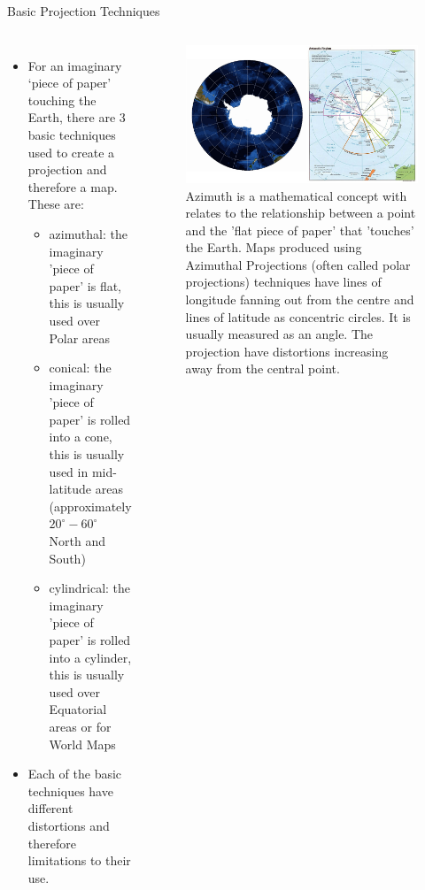 \documentclass[11pt,dvipsnames,ignorenonframetext,aspectratio=169]{beamer}
\providecommand{\tightlist}{%
  \setlength{\itemsep}{0pt}\setlength{\parskip}{0pt}}
\newcommand{\bcolumns}{\begin{columns}[T, onlytextwidth]}
\newcommand{\ecolumns}{\end{columns}}
\begin{document}
\begin{frame}{Basic Projection Techniques}
\protect\hypertarget{basic-projection-techniques}{}
\bcolumns
\small
{}

\begin{itemize}
\tightlist
\item
  For an imaginary `piece of paper' touching the Earth, there are 3
  basic techniques used to create a projection and therefore a map.
  These are:

  \begin{itemize}
  \footnotesize
  \item azimuthal: the imaginary 'piece of paper' is flat, this is usually used over Polar areas
  \item conical: the imaginary 'piece of paper' is rolled into a cone, this is usually used in mid-latitude areas (approximately $20^\circ - 60^\circ$ North and South)
  \item cylindrical: the imaginary 'piece of paper' is rolled into a cylinder, this is usually used over Equatorial areas or for World Maps
  \end{itemize}
\item
  Each of the basic techniques have different distortions and therefore
  limitations to their use.
\end{itemize}


\begin{figure}
\includegraphics[width=0.98\linewidth]{../images/Antarctica comp_1} \caption{Azimuth is a mathematical concept with relates to the relationship between a point and the 'flat piece of paper' that 'touches' the Earth. Maps produced using Azimuthal Projections (often called polar projections) techniques have lines of longitude fanning out from the centre and lines of latitude as concentric circles. It is usually measured as an angle. The projection have distortions increasing away from the central point.}\label{fig:azimuthal-projection}
\end{figure}

\ecolumns
\end{frame}
\end{document}

